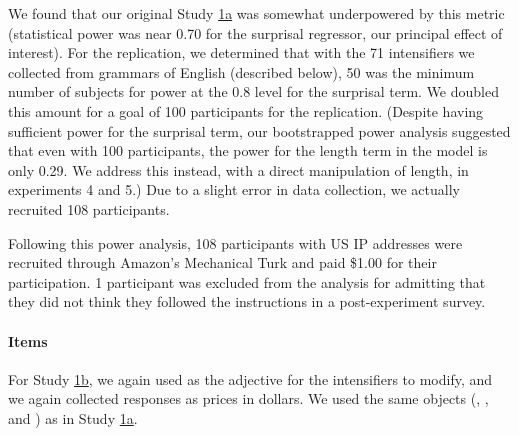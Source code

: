 We found that our original Study \hyperref[sec:study1a]{1a} was somewhat underpowered by this metric (statistical power was near 0.70 for the surprisal regressor, our principal effect of interest).
For the replication, we determined that with the 71 intensifiers we collected from grammars of English (described below), 50 was the minimum number of subjects for power at the 0.8 level for the surprisal term.
We doubled this amount for a goal of 100 participants for the replication.
(Despite having sufficient power for the surprisal term, our bootstrapped power analysis suggested that even with 100 participants, the power for the length term in the model is only 0.29. We address this instead, with a direct manipulation of length, in experiments 4 and 5.)
Due to a slight error in data collection, we actually recruited 108 participants.

Following this power analysis, 108 participants with US IP addresses were recruited through Amazon’s Mechanical Turk and paid \$1.00 for their participation. 1 participant was excluded from the analysis for admitting that they did not think they followed the instructions in a post-experiment survey.

\paragraph{Items}

For Study \hyperref[sec:study1b]{1b}, we again used  as the adjective for the intensifiers to modify, and we again collected responses as prices in dollars.
We used the same objects (, , and ) as in Study  \hyperref[sec:study1a]{1a}.

